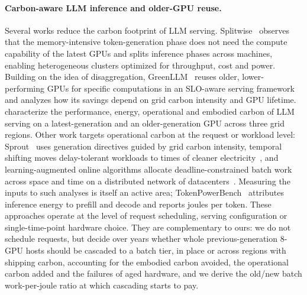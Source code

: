 \documentclass{article} %
\begin{document}
\paragraph{Carbon-aware LLM inference and older-GPU reuse.}
Several works reduce the carbon footprint of LLM serving. Splitwise~\citep{Patel2023SplitwiseEfficient} observes that the memory-intensive token-generation phase does not need the compute capability of the latest GPUs and splits inference phases across machines, enabling heterogeneous clusters optimized for throughput, cost and power. Building on the idea of disaggregation, GreenLLM~\citep{Shi2024GreenllmDisaggregating} reuses older, lower-performing GPUs for specific computations in an SLO-aware serving framework and analyzes how its savings depend on grid carbon intensity and GPU lifetime. \citet{Nguyen2024TowardsSustainable} characterize the performance, energy, operational and embodied carbon of LLM serving on a latest-generation and an older-generation GPU across three grid regions. Other work targets operational carbon at the request or workload level: Sprout~\citep{Li2024SproutGreen} uses generation directives guided by grid carbon intensity, temporal shifting moves delay-tolerant workloads to times of cleaner electricity~\citep{Wiesner2021LetsWait}, and learning-augmented online algorithms allocate deadline-constrained batch work across space and time on a distributed network of datacenters~\citep{Lechowicz2025LearningaugmentedCompetitive}. Measuring the inputs to such analyses is itself an active area; TokenPowerBench~\citep{Niu2026TokenpowerbenchBenchmarking} attributes inference energy to prefill and decode and reports joules per token. These approaches operate at the level of request scheduling, serving configuration or single-time-point hardware choice. They are complementary to ours: we do not schedule requests, but decide over years whether whole previous-generation 8-GPU hosts should be cascaded to a batch tier, in place or across regions with shipping carbon, accounting for the embodied carbon avoided, the operational carbon added and the failures of aged hardware, and we derive the old/new batch work-per-joule ratio at which cascading starts to pay.
\end{document}
